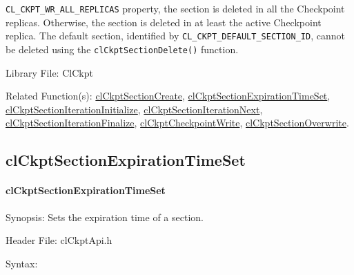 \begin{flushleft}
\begin{Desc}
{\tt{CL\_\-CKPT\_\-WR\_\-ALL\_\-REPLICAS}} property, the section is deleted in all the Checkpoint replicas. Otherwise, the section is deleted in at 
least the active Checkpoint replica. The default section, identified by {\tt{CL\_\-CKPT\_\-DEFAULT\_\-SECTION\_\-ID}}, cannot be deleted using the 
{\tt{clCkptSectionDelete()}} function.
\end{Desc}
\begin{Desc}
\item[Library File:]Cl\-Ckpt\end{Desc}
\begin{Desc}
\item[Related Function(s):]\hyperlink{pageckpt110}{cl\-Ckpt\-Section\-Create}, \hyperlink{pageckpt112}{cl\-Ckpt\-Section\-Expiration\-Time\-Set},
\hyperlink{pageckpt113}{cl\-Ckpt\-Section\-Iteration\-Initialize}, \hyperlink{pageckpt114}{cl\-Ckpt\-Section\-Iteration\-Next},
\hyperlink{pageckpt115}{cl\-Ckpt\-Section\-Iteration\-Finalize}, \hyperlink{pageckpt116}{cl\-Ckpt\-Checkpoint\-Write},
\hyperlink{pageckpt117}{cl\-Ckpt\-Section\-Overwrite}. \end{Desc}
\newpage


\subsection{clCkptSectionExpirationTimeSet}
\hypertarget{pageckpt112}{}\paragraph{cl\-Ckpt\-Section\-Expiration\-Time\-Set}\label{pageckpt112}
\begin{Desc}
\item[Synopsis:]Sets the expiration time of a section.\end{Desc}
\begin{Desc}
\item[Header File:]clCkptApi.h\end{Desc}
\begin{Desc}
\item[Syntax:]


\end{Desc}
\end{flushleft}
